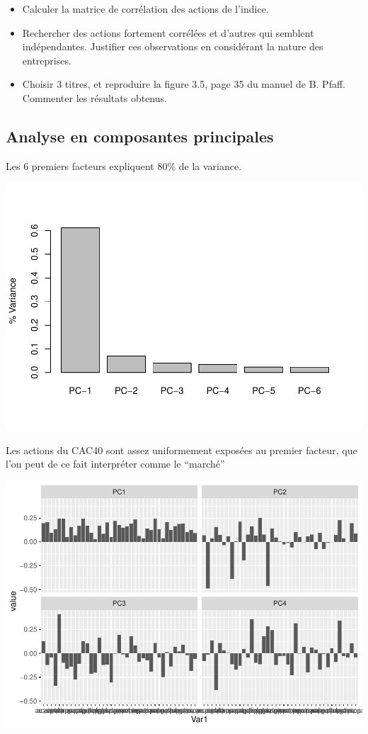 \documentclass[
]{article}
\begin{document}
\begin{itemize}
\item
  Calculer la matrice de corrélation des actions de l'indice.
\item
  Rechercher des actions fortement corrélées et d'autres qui semblent
  indépendantes. Justifier ces observations en considérant la nature des
  entreprises.
\item
  Choisir 3 titres, et reproduire la figure 3.5, page 35 du manuel de B.
  Pfaff. Commenter les résultats obtenus.
\end{itemize}

\hypertarget{analyse-en-composantes-principales}{%
\subsection{Analyse en composantes
principales}\label{analyse-en-composantes-principales}}

Les 6 premiers facteurs expliquent 80\% de la variance.

\includegraphics{TP1-Co_files/figure-latex/unnamed-chunk-3-1.pdf}

Les actions du CAC40 sont assez uniformement exposées au premier
facteur, que l'on peut de ce fait interpréter comme le ``marché''

\includegraphics{TP1-Co_files/figure-latex/unnamed-chunk-4-1.pdf}
\end{document}
